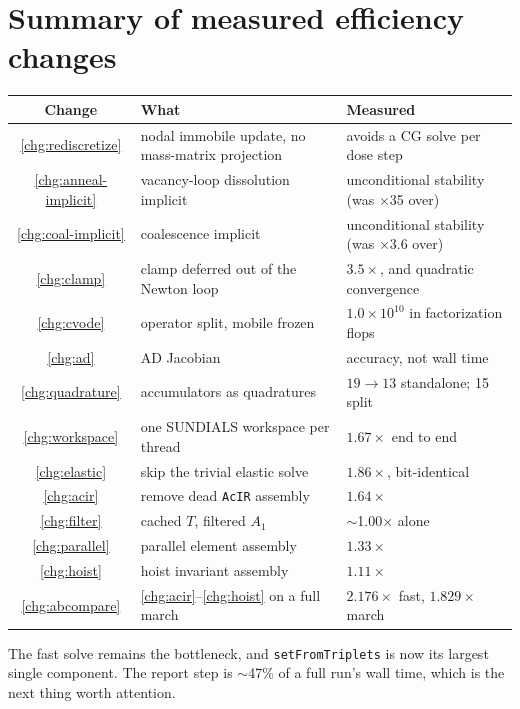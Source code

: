 \documentclass[11pt,a4paper]{article}
\newcommand{\code}[1]{\texttt{\small #1}}
\newcounter{chg}
\begin{document}
\section*{Summary of measured efficiency changes}

\begin{center}
\begin{tabular}{@{}cp{7.3cm}p{5.4cm}@{}}
\toprule
Change & What & Measured \\
\midrule
\ref{chg:rediscretize} & nodal immobile update, no mass-matrix projection & avoids a CG solve per dose step \\
\ref{chg:anneal-implicit} & vacancy-loop dissolution implicit & unconditional stability (was $\times$35 over) \\
\ref{chg:coal-implicit} & coalescence implicit & unconditional stability (was $\times$3.6 over) \\
\ref{chg:clamp} & clamp deferred out of the Newton loop & $3.5\times$, and quadratic convergence \\
\ref{chg:cvode} & operator split, mobile frozen & $1.0\times10^{10}$ in factorization flops \\
\ref{chg:ad} & AD Jacobian & accuracy, not wall time \\
\ref{chg:quadrature} & accumulators as quadratures & $19\rightarrow13$ standalone; 15 split \\
\ref{chg:workspace} & one SUNDIALS workspace per thread & $\mathbf{1.67\times}$ end to end \\
\ref{chg:elastic} & skip the trivial elastic solve & $\mathbf{1.86\times}$, bit-identical \\
\ref{chg:acir} & remove dead \code{AcIR} assembly & $1.64\times$ \\
\ref{chg:filter} & cached $T$, filtered $A_1$ & $\sim$1.00$\times$ alone \\
\ref{chg:parallel} & parallel element assembly & $1.33\times$ \\
\ref{chg:hoist} & hoist invariant assembly & $1.11\times$ \\
\ref{chg:abcompare} & \ref{chg:acir}--\ref{chg:hoist} on a full march &
  $\mathbf{2.176\times}$ fast, $\mathbf{1.829\times}$ march \\
\bottomrule
\end{tabular}
\end{center}

\noindent
The fast solve remains the bottleneck, and \code{setFromTriplets} is now its
largest single component. The report step is $\sim$47\% of a full run's wall
time, which is the next thing worth attention.
\end{document}
